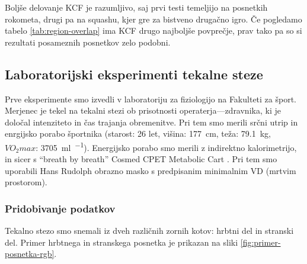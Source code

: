 Boljše delovanje KCF je razumljivo, saj prvi testi temeljijo na posnetkih rokometa, drugi pa na squashu, kjer gre za bistveno drugačno igro. Če pogledamo tabelo \ref{tab:region-overlap} ima KCF drugo najboljše povprečje, prav tako pa so si rezultati posameznih posnetkov zelo podobni. 


\subsection{Laboratorijski eksperimenti tekalne steze}
Prve eksperimente smo izvedli v laboratoriju za fiziologijo na Fakulteti za šport. Merjenec je tekel na tekalni stezi ob prisotnosti operaterja---zdravnika, ki je določal intenziteto in čas trajanja obremenitve. Pri tem smo merili srčni utrip in enrgijsko porabo športnika (starost: 26 let, višina: \SI{177}{\cm}, teža: \SI{79.1}{\kg}, $VO_2max$: \SI{3705}{\ml\per\min}). Energijsko porabo smo merili z indirektno kalorimetrijo, in sicer s ``breath by breath'' Cosmed CPET Metabolic Cart \cite{beaver1973line}. Pri tem smo uporabili Hans Rudolph obrazno masko s predpisanim minimalnim VD (mrtvim prostorom).


\subsubsection{Pridobivanje podatkov}
Tekalno stezo smo snemali iz dveh različnih zornih kotov: hrbtni del in stranski del.  Primer hrbtnega in stranskega posnetka je prikazan na sliki \ref{fig:primer-posnetka-rgb}.

